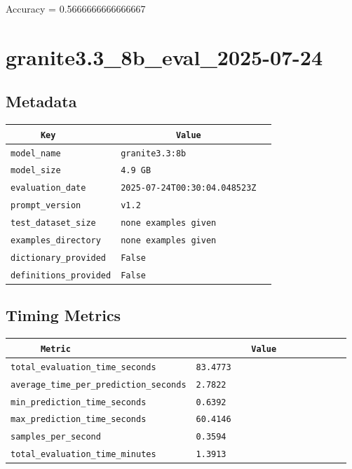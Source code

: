 \documentclass{article}
\begin{document}
\begin{center}
Accuracy = 0.5666666666666667
\end{center}

\section{granite3.3\_8b\_eval\_2025-07-24}
\subsection{Metadata}

\begin{center}
\begin{tabular}{l | l} \hline
    \verb|      Key      | & \verb|           Value           | \\ \hline
    \hline
    \verb|model_name    | & \verb|granite3.3:8b                | \\ \hline
    \verb|model_size    | & \verb|4.9 GB                       | \\ \hline
    \verb|evaluation_date| & \verb|2025-07-24T00:30:04.048523Z  | \\ \hline
    \verb|prompt_version| & \verb|v1.2                         | \\ \hline
    \verb|test_dataset_size| & \verb|none examples given          | \\ \hline
    \verb|examples_directory| & \verb|none examples given          | \\ \hline
    \verb|dictionary_provided| & \verb|False                        | \\ \hline
    \verb|definitions_provided| & \verb|False                        | \\ \hline
\end{tabular}
\end{center}

\subsection{Timing Metrics}

\begin{center}
\begin{tabular}{l | l} \hline
    \verb|      Metric     | & \verb|           Value           | \\ \hline
    \hline
    \verb|total_evaluation_time_seconds| & \verb|83.4773                      | \\ \hline
    \verb|average_time_per_prediction_seconds| & \verb|2.7822                       | \\ \hline
    \verb|min_prediction_time_seconds| & \verb|0.6392                       | \\ \hline
    \verb|max_prediction_time_seconds| & \verb|60.4146                      | \\ \hline
    \verb|samples_per_second| & \verb|0.3594                       | \\ \hline
    \verb|total_evaluation_time_minutes| & \verb|1.3913                       | \\ \hline
\end{tabular}
\end{center}
\end{document}
